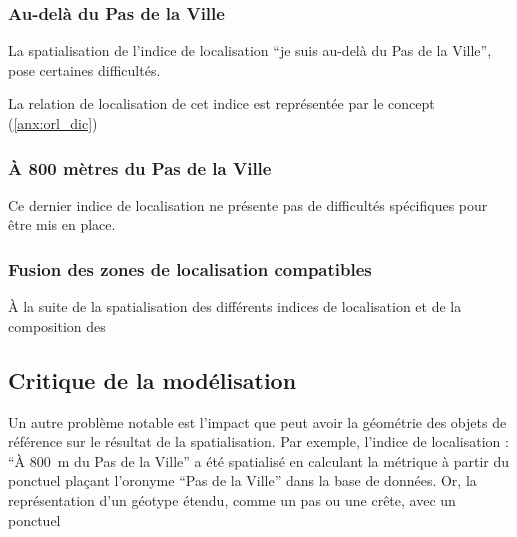 \subsubsection{Au-delà du Pas de la Ville}

La spatialisation de l'indice de localisation \enquote{je suis au-delà
  du Pas de la Ville}, pose certaines difficultés.

La relation de localisation de cet indice est représentée par le
concept 
(\autoref{anx:orl_dic})

\subsubsection{À 800 mètres du Pas de la Ville}

Ce dernier indice de localisation ne présente pas de difficultés
spécifiques pour être mis en place.





\subsubsection{Fusion des zones de localisation compatibles}

À la suite de la spatialisation des différents indices de localisation
et de la composition des 

\subsection{Critique de la modélisation}
\label{subsec:9-2-3}


Un autre problème notable est l'impact que peut avoir la géométrie des
objets de référence sur le résultat de la spatialisation. Par exemple,
l'indice de localisation : \enquote{À \SI{800}{\meter} du Pas de la
  Ville} a été spatialisé en calculant la métrique
 à partir du ponctuel plaçant l'oronyme
\enquote{Pas de la Ville} dans la base de données. Or, la
représentation d'un géotype étendu, comme un pas ou une crête, avec un
ponctuel



